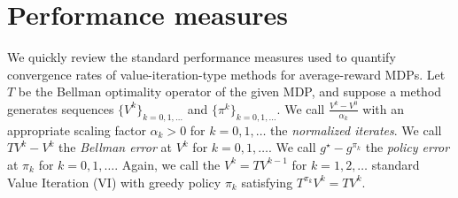 \documentclass{article} %
\begin{document}


\section{Performance measures}
We quickly review the standard performance measures used to quantify convergence rates of value-iteration-type methods for average-reward MDPs. Let $T$ be the Bellman optimality operator of the given MDP, and suppose a method generates sequences $\{V^k\}_{k=0,1,\dots}$ and $\{\pi^k\}_{k=0,1,\dots}$. We call $\frac{V^k-V^0}{\alpha_k}$ with an appropriate scaling factor $\alpha_k>0$ for $k=0,1,\dots$ the \emph{normalized iterates}. We call $TV^k-V^k$ the \emph{Bellman error} at $V^k$ for $k=0,1,\dots$. 
We call  $g^{\star}-g^{\pi_k}$ the \emph{policy error} at $\pi_k$ for $k=0,1,\dots$.
Again, we call the $V^{k}=TV^{k-1}$ for $k=1,2,\dots$ standard Value Iteration (VI) with greedy policy $\pi_k$ satisfying $T^{\pi_k}V^k= TV^k.$ 
\end{document}
